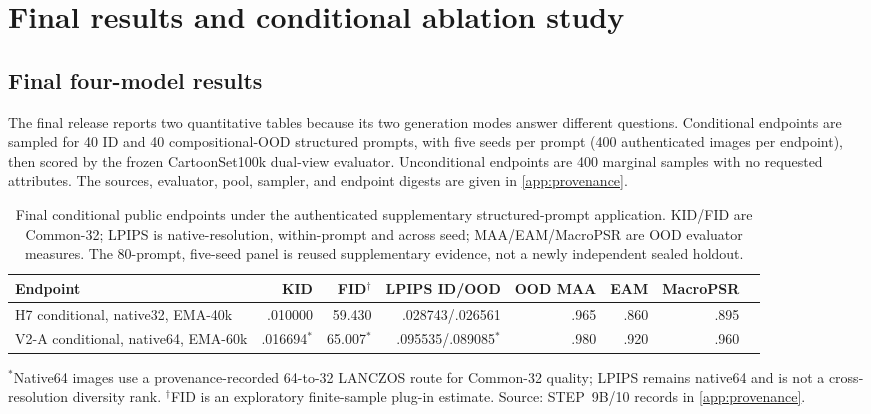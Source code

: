 \section{Final results and conditional ablation study}\label{sec:results}

\subsection{Final four-model results}
The final release reports two quantitative tables because its two generation modes answer different questions. Conditional endpoints are sampled for 40 ID and 40 compositional-OOD structured prompts, with five seeds per prompt (400 authenticated images per endpoint), then scored by the frozen CartoonSet100k dual-view evaluator. Unconditional endpoints are 400 marginal samples with no requested attributes. The sources, evaluator, pool, sampler, and endpoint digests are given in \cref{app:provenance}.

\begin{table}[htbp]
\centering\small
\caption{Final conditional public endpoints under the authenticated supplementary structured-prompt application. KID/FID are Common-32; LPIPS is native-resolution, within-prompt and across seed; MAA/EAM/MacroPSR are OOD evaluator measures. The 80-prompt, five-seed panel is reused supplementary evidence, not a newly independent sealed holdout.}\label{tab:conditional-final}
\begin{tabular}{lrrrrrrr}
\toprule
Endpoint & KID & FID$^{\dagger}$ & LPIPS ID/OOD & OOD MAA & EAM & MacroPSR \\
\midrule
H7 conditional, native32, EMA-40k & .010000 & 59.430 & .028743/.026561 & .965 & .860 & .895 \\
V2-A conditional, native64, EMA-60k & .016694$^{*}$ & 65.007$^{*}$ & .095535/.089085$^{*}$ & .980 & .920 & .960 \\
\bottomrule
\end{tabular}
\par\smallskip\footnotesize $^{*}$Native64 images use a provenance-recorded 64-to-32 LANCZOS route for Common-32 quality; LPIPS remains native64 and is not a cross-resolution diversity rank. $^{\dagger}$FID is an exploratory finite-sample plug-in estimate. Source: STEP~9B/10 records in \cref{app:provenance}.
\end{table}

